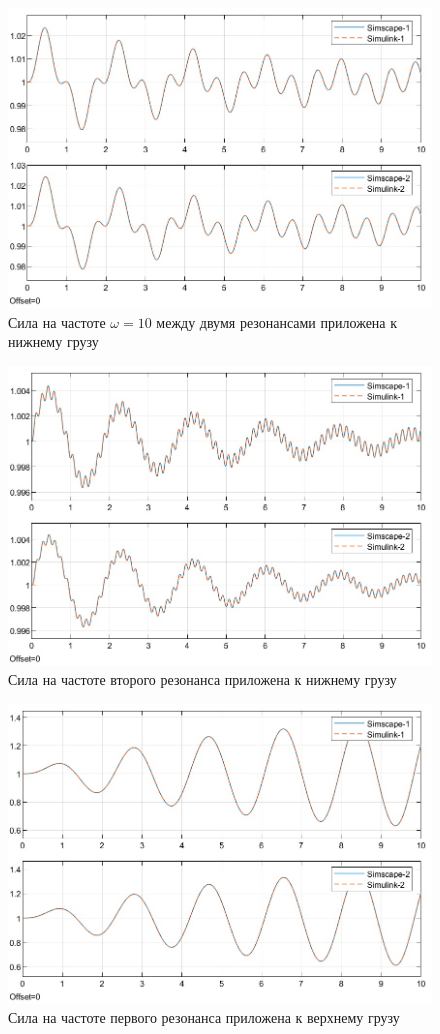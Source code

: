 \documentclass{article}
\begin{document}
	\begin{figure}[H]
		\centering
		\includegraphics[width=0.7\linewidth]{nizr1r2}
		\caption{Сила на частоте $\omega = 10$ между двумя резонансами приложена к нижнему грузу}
		\label{fig:nizr1r2}
	\end{figure}
	\begin{figure}[H]
		\centering
		\includegraphics[width=0.7\linewidth]{nizr2}
		\caption{Сила на частоте второго резонанса приложена к нижнему грузу}
		\label{fig:nizr2}
	\end{figure}
	\begin{figure}[H]
		\centering
		\includegraphics[width=0.7\linewidth]{verxr1}
		\caption{Сила на частоте первого резонанса приложена к верхнему грузу}
		\label{fig:verxr1}
	\end{figure}
\end{document}
